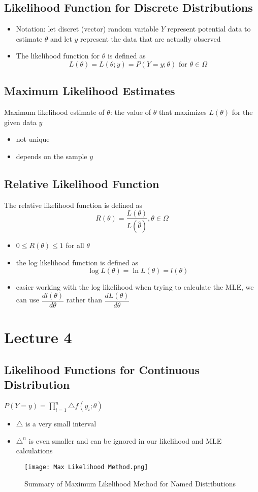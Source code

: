 \documentclass[11pt]{article}
\newcommand{\ds}{\displaystyle}
\begin{document}
\subsection{Likelihood Function for Discrete Distributions}
\begin{itemize}
  \item Notation: let discret (vector) random variable $Y$ represent potential data to estimate $\theta$ and let $y$ represent the data that are actually observed 
  \item The likelihood function for $\theta$ is defined as \[L(\theta) = L(\theta; y) = P(Y=y; \theta)\text{\ for $\theta\in\Omega$}\]
\end{itemize}
\subsection{Maximum Likelihood Estimates}
Maximum likelihood estimate of $\theta$: the value of $\theta$ that maximizes $L(\theta)$ for the given data $y$
\begin{itemize}
  \item not unique 
  \item depends on the sample $y$
\end{itemize}
\subsection{Relative Likelihood Function}
The relative likelihood function is defined as \[R(\theta) = \frac{L(\theta)}{L(\hat{\theta})}, \theta\in\Omega\]
\begin{itemize}
  \item $0\leq R(\theta)\leq 1$ for all $\theta$
  \item the log likelihood function is defined as \[\log L(\theta) = \ln L(\theta) = l(\theta)\]
  \item easier working with the log likelihood when trying to calculate the MLE, we can use $\dfrac{dl(\theta)}{d\theta}$ rather than $\dfrac{dL(\theta)}{d\theta}$
\end{itemize}

\section{Lecture 4}
\subsection{Likelihood Functions for Continuous Distribution}
$\ds P(Y=y)=\prod_{i=1}^{n}\triangle f(y_i;\theta)$
\begin{itemize}
  \item $\triangle$ is a very small interval 
  \item $\triangle^n$ is even smaller and can be ignored in our likelihood and MLE calculations
\end{itemize}
\begin{figure}[tbhp]
	\begin{center}
		\texttt{[image: Max Likelihood Method.png]}
	\end{center}
	\caption{Summary of Maximum Likelihood Method for Named Distributions}
	\label{figcaption}
\end{figure}
\newpage 
\end{document}
